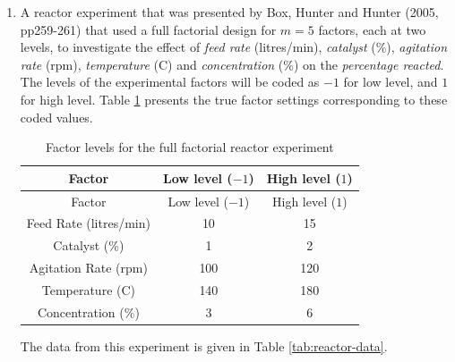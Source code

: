 \documentclass[
]{book}
\theoremstyle{definition}
\theoremstyle{definition}
\theoremstyle{definition}
\theoremstyle{definition}
\theoremstyle{remark}
\begin{document}
\begin{enumerate}
\def\labelenumi{\arabic{enumi}.}
\item
  A reactor experiment that was presented by Box, Hunter and Hunter (2005, pp259-261) that used a full factorial design for \(m=5\) factors, each at two levels, to investigate the effect of \emph{feed rate} (litres/min), \emph{catalyst} (\%), \emph{agitation rate} (rpm), \emph{temperature} (C) and \emph{concentration} (\%) on the \emph{percentage reacted}. The levels of the experimental factors will be coded as \(-1\) for low level, and \(1\) for high level. Table \ref{tab:reactor-expt} presents the true factor settings corresponding to these coded values.

  \begin{longtable}[]{@{}ccc@{}}
  \caption{\label{tab:reactor-expt} Factor levels for the full factorial reactor experiment}\tabularnewline
  \toprule()
  Factor & Low level (\(-1\)) & High level (\(1\)) \\
  \midrule()
  \endfirsthead
  \toprule()
  Factor & Low level (\(-1\)) & High level (\(1\)) \\
  \midrule()
  \endhead
  Feed Rate (litres/min) & 10 & 15 \\
  Catalyst (\%) & 1 & 2 \\
  Agitation Rate (rpm) & 100 & 120 \\
  Temperature (C) & 140 & 180 \\
  Concentration (\%) & 3 & 6 \\
  \bottomrule()
  \end{longtable}

  The data from this experiment is given in Table \ref{tab:reactor-data}.


\end{enumerate}
\end{document}
